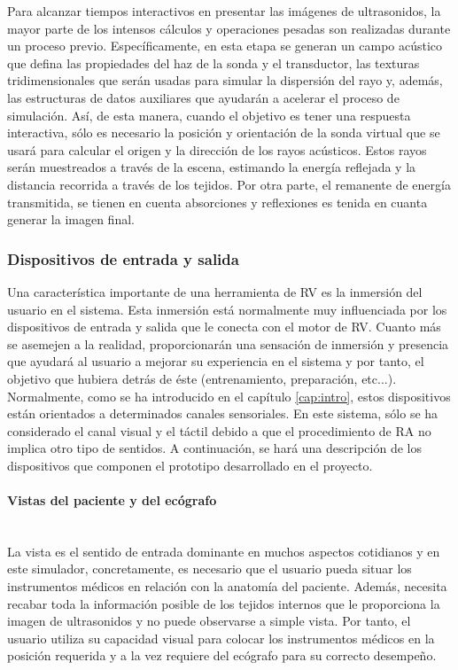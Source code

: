 Para alcanzar tiempos interactivos en presentar las imágenes de ultrasonidos, la mayor parte de los intensos cálculos y operaciones pesadas son realizadas durante un proceso previo. Específicamente, en esta etapa se generan un campo acústico que defina las propiedades del haz de la sonda y el transductor, las texturas tridimensionales que serán usadas para simular la dispersión del rayo y, además, las estructuras de datos auxiliares que ayudarán a acelerar el proceso de simulación.
Así, de esta manera, cuando el objetivo es tener una respuesta interactiva, sólo es necesario la posición y orientación de la sonda virtual que se usará para calcular el origen y la dirección de los rayos acústicos. Estos rayos serán muestreados a través de la escena, estimando la energía reflejada y la distancia recorrida a través de los tejidos. Por otra parte, el remanente de energía transmitida, se tienen en cuenta absorciones y reflexiones es tenida en cuanta generar la imagen final.

\subsubsection{Dispositivos de entrada y salida}

Una característica importante de una herramienta de \ac{RV} es la inmersión del usuario en el sistema. Esta inmersión está normalmente muy influenciada por los dispositivos de entrada y salida que le conecta con el motor de \ac{RV}. Cuanto más se asemejen a la realidad, proporcionarán una sensación de inmersión y presencia que ayudará al usuario a mejorar su experiencia en el sistema y por tanto, el objetivo que hubiera detrás de éste (entrenamiento, preparación, etc...). Normalmente, como se ha introducido en el capítulo \ref{cap:intro}, estos dispositivos están orientados a determinados canales sensoriales. En este sistema, sólo se ha considerado el canal visual y el táctil debido a que el procedimiento de \ac{RA} no implica otro tipo de sentidos. A continuación, se hará una descripción de los dispositivos que componen el prototipo desarrollado en el proyecto.

\paragraph{Vistas del paciente y del ecógrafo}\mbox{}\\

La vista es el sentido de entrada dominante en muchos aspectos cotidianos y en este simulador, concretamente, es necesario que el usuario pueda situar los instrumentos médicos en relación con la anatomía del paciente. Además, necesita recabar toda la información posible de los tejidos internos que le proporciona la imagen de ultrasonidos y no puede observarse a simple vista. Por tanto, el usuario utiliza su capacidad visual para colocar los instrumentos médicos en la posición requerida y a la vez requiere del ecógrafo para su correcto desempeño.

